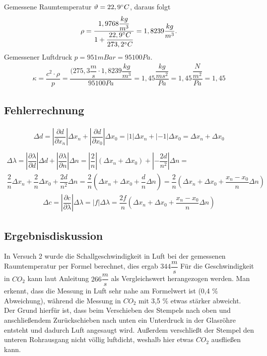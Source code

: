 \documentclass{scrartcl}
\begin{document}
Gemessene Raumtemperatur $\vartheta = 22,9\degree C$, daraus folgt 
\begin{align*}
\rho =  \dfrac{1,9768 \dfrac{kg}{m^3}}{1 + \dfrac{22,9\degree C}{273,2 \degree C}} = 1,8239 \dfrac{kg}{m^3}.
\end{align*}
Gemessener Luftdruck $p = 951 mBar = 95100 Pa$.
\begin{align*}
\kappa = \dfrac{c^2 \cdot \rho}{p} = \dfrac{(275,3 \dfrac{m}{s} \cdot 1,8239 \dfrac{kg}{m^3}}{95100 Pa} = 1,45 \dfrac{\dfrac{kg}{ms^2}}{Pa} = 1,45 \dfrac{\dfrac{N}{m^2}}{Pa} = 1,45
\end{align*}
\subsection{Fehlerrechnung}
\begin{align*}
\Delta d = \left| \dfrac{\partial d}{\partial x_{n}} \right| \Delta x_{n} + \left| \dfrac{\partial d}{\partial x_{0}} \right| \Delta x_{0} = \left| 1 \right| \Delta x_{n} + \left| -1 \right| \Delta x_{0} = \Delta x_{n} + \Delta x_{0} \\
\end{align*}
\begin{align*}
\Delta \lambda = \left| \dfrac{\partial \lambda}{\partial d} \right| \Delta d + \left| \dfrac{\partial \lambda}{\partial n} \right| \Delta n = \left| \dfrac{2}{n} \right| (\Delta x_{n} + \Delta x_{0}) + \left| - \dfrac{2d}{n^2} \right| \Delta n = \\
\dfrac{2}{n} \Delta x_{n} + \dfrac{2}{n} \Delta x_{0} + \dfrac{2d}{n^2} \Delta n = \dfrac{2}{n} (\Delta x_{n} + \Delta x_{0} + \dfrac{d}{n} \Delta n) = \dfrac{2}{n} (\Delta x_{n} + \Delta x_{0} + \dfrac{x_{n} - x_{0}}{n} \Delta n)
\end{align*}
\begin{align*}
\Delta c = \left| \dfrac{\partial c}{\partial \lambda} \right| \Delta \lambda = \left| f \right| \Delta \lambda = \dfrac{2f}{n} (\Delta x_{n} + \Delta x_{0} + \dfrac{x_{n} - x_{0}}{n} \Delta n)
\end{align*}
\subsection{Ergebnisdiskussion}
In Versuch 2 wurde die Schallgeschwindigkeit in Luft bei der gemessenen Raumtemperatur per Formel berechnet, dies ergab $344 \dfrac{m}{s}$
Für die Geschwindigkeit in $CO_{2}$ kann laut Anleitung $266 \dfrac{m}{s}$ als Vergleichswert herangezogen werden.
Man erkennt, dass die Messung in Luft sehr nahe am Formelwert ist (0,4 \% Abweichung), während die Messung in $CO_{2}$ mit 3,5 \% etwas stärker abweicht. Der Grund hierfür ist, dass beim Verschieben des Stempels nach oben und anschließendem Zurückschieben nach unten ein Unterdruck in der Glasröhre entsteht und dadurch Luft angesaugt wird. Außerdem verschließt der Stempel den unteren Rohrausgang nicht völlig luftdicht, weshalb hier etwas $CO_{2}$ ausfließen kann.
\end{document}
